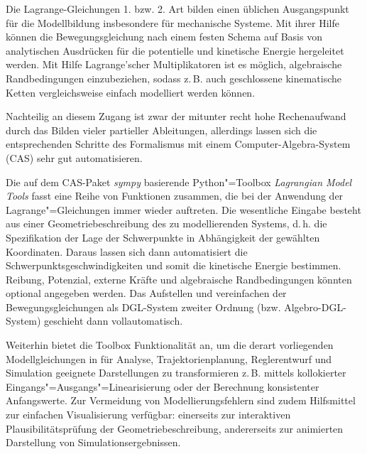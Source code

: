 \documentclass{gma}
\begin{document}
\erstautor{}

\maketitle
Die Lagrange-Gleichungen 1. bzw. 2. Art bilden einen üblichen Ausgangspunkt für die Modellbildung insbesondere für mechanische Systeme. Mit ihrer Hilfe können die Bewegungsgleichung nach einem festen Schema auf Basis von analytischen Ausdrücken für die potentielle und kinetische Energie hergeleitet werden. Mit Hilfe Lagrange'scher Multiplikatoren ist es möglich, algebraische Randbedingungen einzubeziehen, sodass z.\,B. auch geschlossene kinematische Ketten vergleichsweise einfach modelliert werden können.

Nachteilig an diesem Zugang ist zwar der mitunter recht hohe Rechenaufwand durch das Bilden vieler partieller Ableitungen, allerdings lassen sich die entsprechenden Schritte des Formalismus mit einem Computer-Algebra-System (CAS) sehr gut automatisieren.

Die auf dem CAS-Paket \textit{sympy} basierende Python"=Toolbox \textit{Lagrangian Model Tools} fasst eine Reihe von Funktionen zusammen, die bei der Anwendung der Lagrange"=Gleichungen immer wieder auftreten. Die wesentliche Eingabe besteht aus einer Geometriebeschreibung des zu modellierenden Systems, d.\,h. die Spezifikation der Lage der Schwerpunkte in Abhängigkeit der gewählten Koordinaten. Daraus lassen sich dann automatisiert die Schwerpunktsgeschwindigkeiten und somit die kinetische Energie bestimmen. Reibung, Potenzial, externe Kräfte und algebraische Randbedingungen könnten optional angegeben werden.
Das Aufstellen und vereinfachen der Bewegungsgleichungen als DGL-System zweiter Ordnung (bzw. Algebro-DGL-System) geschieht dann vollautomatisch.

Weiterhin bietet die Toolbox Funktionalität an, um die derart vorliegenden Modellgleichungen in für Analyse, Trajektorienplanung, Reglerentwurf und Simulation geeignete Darstellungen zu transformieren z.\,B. mittels kollokierter Eingangs"=Ausgangs"=Linearisierung oder der Berechnung konsistenter Anfangswerte. Zur Vermeidung von Modellierungsfehlern sind zudem Hilfsmittel zur einfachen Visualisierung verfügbar: einerseits zur interaktiven Plausibilitätsprüfung der Geometriebeschreibung, andererseits zur animierten Darstellung von Simulationsergebnissen.




%
% 
\end{document}
